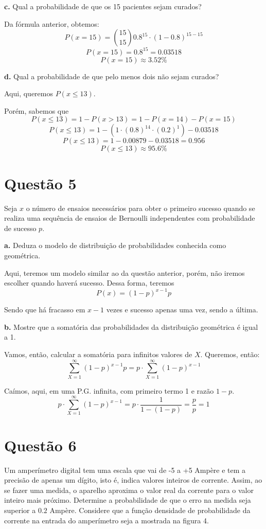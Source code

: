 \documentclass[a5paper]{report}
\begin{document}
\textbf{c.}
Qual a probabilidade de que os 15 pacientes sejam curados?

Da fórmula anterior, obtemos:
\[P(x = 15) = \binom{15}{15} 0.8^{15} \cdot (1 - 0.8)^{15 - 15}\]
\[P(x = 15) = 0.8^15 = 0.03518\]
\[P(x = 15) \approx 3.52\%\]


\textbf{d.}
Qual a probabilidade de que pelo menos dois não sejam curados?

Aqui, queremos $P(x \leq 13)$.

Porém, sabemos que
\[P(x \leq 13) = 1 - P(x > 13) = 1 - P(x = 14) - P(x = 15)\]
\[P(x \leq 13) = 1 - (1 \cdot (0.8)^{14} \cdot (0.2)^{1}) - 0.03518\]
\[P(x \leq 13) = 1 - 0.00879 - 0.03518 = 0.956\]
\[P(x \leq 13) \approx 95.6\%\]


\section*{Questão 5}
Seja $x$ o número de ensaios necessários para obter o primeiro sucesso quando se realiza uma sequência de ensaios de Bernoulli independentes com probabilidade de sucesso $p$.

\textbf{a.}
Deduza o modelo de distribuição de probabilidades conhecida como geométrica.

Aqui, teremos um modelo similar ao da questão anterior, porém, não iremos escolher quando haverá sucesso. Dessa forma, teremos
\[P(x) = (1 - p)^{x - 1}p\]

Sendo que há fracasso em $x - 1$ vezes e sucesso apenas uma vez, sendo a última.

\textbf{b.}
Mostre que a somatória das probabilidades da distribuição geométrica é igual a 1.

Vamos, então, calcular a somatória para infinitos valores de $X$. Queremos, então:
\[\sum_{X = 1}^{\infty} (1 - p)^{x - 1}p = p \cdot \sum_{X = 1}^{\infty} (1 - p)^{x - 1}\]

Caímos, aqui, em uma P.G. infinita, com primeiro termo 1 e razão $1 - p$.
\[p \cdot \sum_{X = 1}^{\infty} (1 - p)^{x - 1} = p \cdot \frac{1}{1 - (1 - p)} = \frac{p}{p} = 1\]


\section*{Questão 6}
Um amperímetro digital tem uma escala que vai de -5 a +5 Ampère e tem a precisão de apenas um dígito, isto é, indica valores inteiros de corrente. Assim, ao se fazer uma medida, o aparelho aproxima o valor real da corrente para o valor inteiro mais próximo. Determine a probabilidade de que o erro na medida seja superior a $0.2$ Ampère. Considere que a função densidade de probabilidade da
corrente na entrada do amperímetro seja a mostrada na figura 4.
\end{document}
